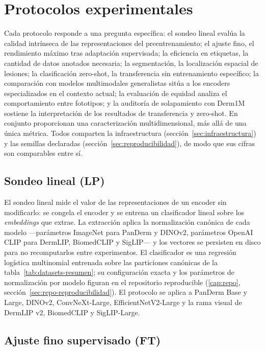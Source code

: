 \section{Protocolos experimentales}
\label{sec:protocolos}

Cada protocolo responde a una pregunta específica: el sondeo lineal
evalúa la calidad intrínseca de las representaciones del
preentrenamiento; el ajuste fino, el rendimiento máximo tras
adaptación supervisada; la eficiencia en etiquetas, la cantidad de
datos anotados necesaria; la segmentación, la localización espacial
de lesiones; la clasificación zero-shot, la transferencia sin
entrenamiento específico; la comparación con modelos multimodales
generalistas sitúa a los encoders especializados en el contexto
actual; la evaluación de equidad analiza el comportamiento entre
fototipos; y la auditoría de solapamiento con Derm1M sostiene la
interpretación de los resultados de transferencia y zero-shot. En
conjunto proporcionan una caracterización multidimensional, más allá
de una única métrica. Todos comparten la infraestructura
(sección~\ref{sec:infraestructura}) y las semillas declaradas
(sección~\ref{sec:reproducibilidad}), de modo que sus cifras son
comparables entre sí.

\subsection{Sondeo lineal (LP)}
\label{sec:lp}

El sondeo lineal mide el valor de las representaciones de un encoder
sin modificarlo: se congela el encoder y se entrena un clasificador
lineal sobre los \emph{embeddings} que extrae. La extracción aplica
la normalización canónica de cada modelo —parámetros ImageNet para
PanDerm y DINOv2, parámetros OpenAI CLIP para DermLIP, BiomedCLIP y
SigLIP— y los vectores se persisten en disco para no recomputarlos
entre experimentos. El clasificador es una regresión logística
multinomial entrenada sobre las particiones canónicas de la
tabla~\ref{tab:datasets-resumen}; su configuración exacta y los
parámetros de normalización por modelo figuran en el repositorio
reproducible (\ref{cap:repo}, sección~\ref{sec:repo-reproducibilidad}).
El protocolo se aplica a PanDerm Base y Large, DINOv2,
ConvNeXt-Large, EfficientNetV2-Large y la rama visual de DermLIP v2,
BiomedCLIP y SigLIP-Large.

\subsection{Ajuste fino supervisado (FT)}
\label{sec:ft}

